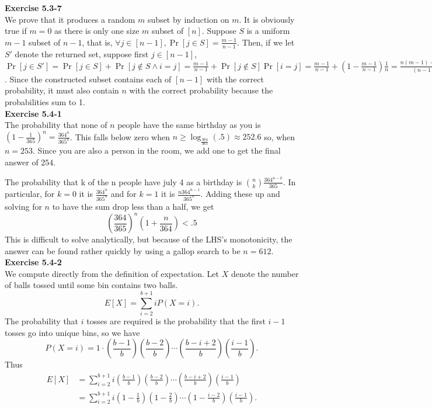 \documentclass{article}
\begin{document}
\noindent\textbf{Exercise 5.3-7}\\

We prove that it produces a random $m$ subset by induction on $m$. It is obviously true if $m=0$ as there is only one size $m$ subset of $[n]$. Suppose $S$ is a uniform $m-1$ subset of $n-1$, that is, $\forall j\in[n-1], \Pr[j\in S] = \frac{m-1}{n-1}$. Then, if we let $S'$ denote the returned set, suppose first $j\in [n-1]$, $\Pr[j\in S'] = \Pr[j\in S] + \Pr[j\not\in S \wedge  i=j] = \frac{m-1}{n-1} + \Pr[j\not\in S]\Pr[i=j] = \frac{m-1}{n-1} + \left(1 - \frac{m-1}{n-1}\right)\frac{1}{n} = \frac{n(m-1) +n-m}{(n-1)n} = \frac{nm -m}{(n-1)n} = \frac{m}{n}$. Since the constructed subset contains each of $[n-1]$ with the correct probability, it must also contain $n$ with the correct probability because the probabilities sum to 1.\\



\noindent\textbf{Exercise 5.4-1}\\

The probability that none of $n$ people have the same birthday as you is $(1-\frac{1}{365})^n= \frac{364^n}{365^n}$. This falls below zero when $n\ge \log_{\frac{364}{365}}(.5) \approx 252.6$ so, when $n=253$. Since you are also a person in the room, we add one to get the final answer of $254$.

The probability that k of the n people have july 4 as a birthday is $\binom{n}{k} \frac{364^{n-k}}{365}$. In particular, for $k=0$ it is $\frac{364^n}{365^n}$ and for $k=1$ it is $\frac{n364^{n-1}}{365^n}$. Adding these up and solving for $n$ to have the sum drop less than a half, we get
\[
\left(\frac{364}{365}\right)^n \left( 1 + \frac{n}{364}\right) <.5
\]
This is difficult to solve analytically, but  because of the LHS's monotonicity, the answer can be found rather quickly by using a gallop search to be $n=612$.\\

\noindent\textbf{Exercise 5.4-2}\\

We compute directly from the definition of expectation. Let $X$ denote the number of balls tossed until some bin contains two balls. 
\[E[X] = \sum_{i=2}^{b+1}iP(X=i).\]
The probability that $i$ tosses are required is the probability that the first $i-1$ tosses go into unique bins, so we have
\[ P(X=i) = 1\cdot \left(\frac{b-1}{b}\right)\left(\frac{b-2}{b}\right) \cdots \left(\frac{b-i+2}{b}\right)\left(\frac{i-1}{b}\right).\]
Thus
\begin{align*}
 E[X] &=  \sum_{i=2}^{b+1}i\left(\frac{b-1}{b}\right)\left(\frac{b-2}{b}\right) \cdots \left(\frac{b-i+2}{b}\right)\left(\frac{i-1}{b}\right) \\
&=\sum_{i=2}^{b+1}i\left(1-\frac{1}{b}\right)\left(1-\frac{2}{b}\right) \cdots \left(1-\frac{i-2}{b}\right)\left(\frac{i-1}{b}\right). \\
\end{align*}
\end{document}
